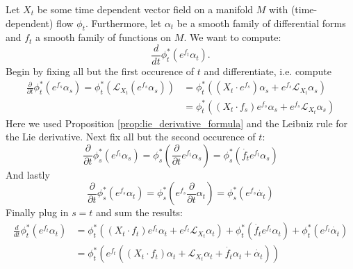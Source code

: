 \begin{example}
    Let $X_t$ be some time dependent vector field on a manifold $M$ with (time-dependent) flow $\phi_t$. Furthermore, let $\alpha_t$ be a smooth family of differential forms and $f_t$ a smooth family of functions on $M$. We want to compute:
    \[
    \frac{d}{dt}\phi_t^\ast(e^{f_t}\alpha_t).
    \]
    Begin by fixing all but the first occurence of $t$ and differentiate, i.e. compute
    \begin{align*}
        \frac{\partial}{\partial t} \phi_t^\ast(e^{f_s}\alpha_s) = \phi_t^\ast(\mathcal{L}_{X_t}(e^{f_s}\alpha_s)) &= \phi_t^\ast((X_t \cdot e^{f_s})\alpha_s + e^{f_s}\mathcal{L}_{X_t}\alpha_s)\\ &= \phi_t^\ast((X_t \cdot f_s) e^{f_s} \alpha_s + e^{f_s}\mathcal{L}_{X_t}\alpha_s)
    \end{align*}
    Here we used Proposition \ref{prop:lie_derivative_formula} and the Leibniz rule for the Lie derivative. Next fix all but the second occurence of $t$:
    \[
        \frac{\partial}{\partial t} \phi_s^\ast(e^{f_t}\alpha_s) = \phi_s^\ast(\frac{\partial }{\partial t}e^{f_t}\alpha_s) = \phi_s^\ast(\dot{f_t}e^{f_t}\alpha_s)
    \]
    And lastly
    \[
        \frac{\partial }{\partial t} \phi_s^\ast(e^{f_s}\alpha_t) = \phi_s^\ast(e^{f_s}\frac{\partial }{\partial t} \alpha_t) = \phi_s^\ast(e^{f_s}\dot{\alpha_t})
    \]
    Finally plug in $s=t$ and sum the results:
    \begin{align*}
        \frac{d}{dt}\phi_t^\ast(e^{f_t}\alpha_t) &= \phi_t^\ast((X_t \cdot f_t) e^{f_t} \alpha_t + e^{f_t}\mathcal{L}_{X_t}\alpha_t) + \phi_t^\ast(\dot{f_t}e^{f_t}\alpha_t) + \phi_t^\ast(e^{f_t}\dot{\alpha_t})\\
        &= \phi_t^\ast(e^{f_t}((X_t \cdot f_t) \alpha_t + \mathcal{L}_{X_t}\alpha_t + \dot{f_t}\alpha_t + \dot{\alpha_t}))
    \end{align*}
\end{example}
